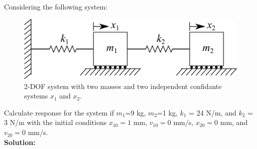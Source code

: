 \documentclass[12pt,letter]{article}
\begin{document}
	\begin{example}
	\label{ex:2-DOF}
	Considering the following system:
	\begin{figure}[H]
		\centering
		\includegraphics[]{../figures/2-DOF-spring_mass_horizontal.png}
		\caption{2-DOF system with two masses and two independent confidante systems $x_1$ and $x_2$.}
	\end{figure}
	Calculate response for the system if $m_1$=9 kg, $m_2$=1 kg, $k_1$ = 24 N/m, and $k_2$ = 3 N/m with the initial conditions $x_{10}=1$ mm, $v_{10}=0$ mm/s, $x_{20}=0$ mm, and $v_{20}=0$ mm/s. \\
	
	
	\noindent \textbf{Solution:} 


\end{example}
\end{document}
